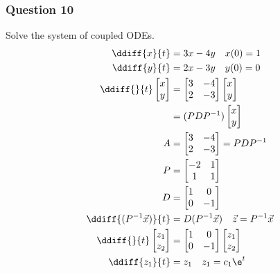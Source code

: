 \documentclass{math}
\begin{document}
\subsubsection*{Question 10}
Solve the system of coupled ODEs.
\begin{align*}
  \ddiff{x}{t} &= 3x-4y \quad x(0) = 1 \\
  \ddiff{y}{t} &= 2x-3y \quad y(0) = 0 \\
  \ddiff{}{t}\begin{bmatrix}x \\ y\end{bmatrix} &=
    \begin{bmatrix}3 & -4 \\ 2 & -3\end{bmatrix}
    \begin{bmatrix}x \\ y\end{bmatrix} \\
  &= (PDP^{-1})\begin{bmatrix}x \\ y\end{bmatrix} \\
  A &= \begin{bmatrix}3 & -4 \\ 2 & -3\end{bmatrix} = PDP^{-1} \\
  P &= \begin{bmatrix}-2 & 1 \\ 1 & 1\end{bmatrix} \\
  D &= \begin{bmatrix}1 & 0 \\ 0 & -1\end{bmatrix} \\
  \ddiff{(P^{-1}\vec{x})}{t} &= D(P^{-1}\vec{x}) \quad
    \vec{z} = P^{-1}\vec{x} \\
  \ddiff{}{t}\begin{bmatrix}z_1 \\ z_2\end{bmatrix} &=
    \begin{bmatrix}1 & 0 \\ 0 & -1\end{bmatrix}
    \begin{bmatrix}z_1 \\ z_2\end{bmatrix} \\
  \ddiff{z_1}{t} &= z_1 \quad z_1 = c_1\e^{t} \\

\end{align*}
\end{document}
